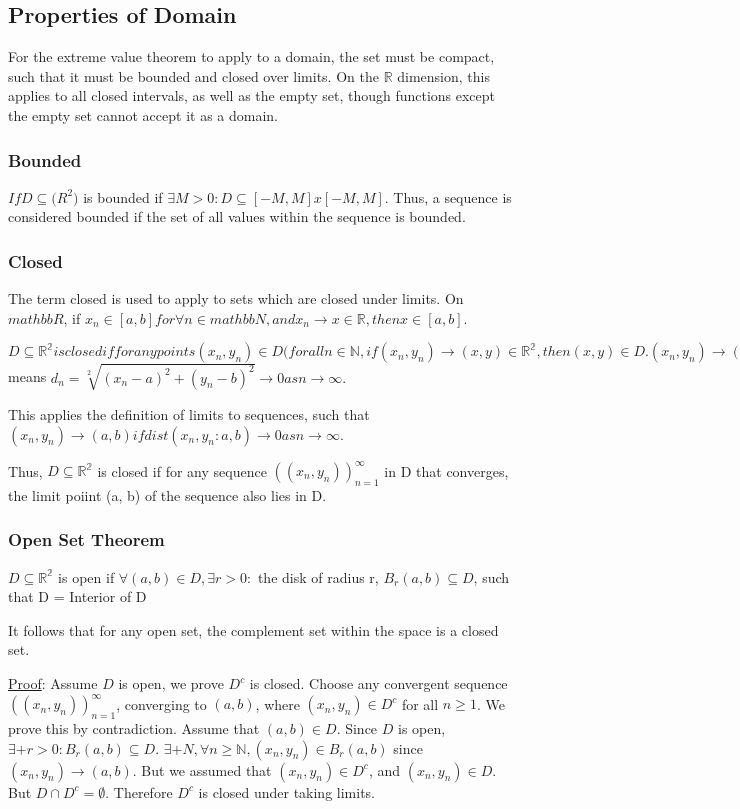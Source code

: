 \documentclass[11 pt, twoside]{article}
\begin{document}
\subsection{Properties of Domain}
For the extreme value theorem to apply to a domain, the set must be compact, such that it must be bounded and closed over limits. On the $\mathbb{R}$ dimension, this applies to all closed intervals, as well as the empty set, though functions except the empty set cannot accept it as a domain.

\subsubsection{Bounded}
$If D \subseteq \mathbb(R^2)$ is bounded if $\exists M > 0: D \subseteq [-M, M] x [-M, M]$. Thus, a sequence is considered bounded if the set of all values within the sequence is bounded.

\subsubsection{Closed}
The term closed is used to apply to sets which are closed under limits. On $mathbb{R}$, if $x_n \in [a, b] for \forall n \in mathbb{N}, and x_n \to x \in \mathbb{R}, then x \in [a, b]$.

$D \subseteq \mathbb{R^2} is closed if for any points (x_n, y_n) \in D (for all n \in \mathbb{N}, if (x_n, y_n) \to (x, y) \in \mathbb{R^2}, then (x, y) \in D. (x_n, y_n) \to (a, b) as n \to \infty$ means $d_n = \sqrt[2]{(x_n - a)^2 + (y_n - b)^2} \to 0 as n \to \infty.$

This applies the definition of limits to sequences, such that $(x_n, y_n) \to (a, b) if dist(x_n, y_n: a, b) \to 0 as n \to \infty$.

Thus, $D \subseteq \mathbb{R^2}$ is closed if for any sequence $((x_n, y_n))^\infty_{n=1}$ in D that converges, the limit poiint (a, b) of the sequence also lies in D.

\subsubsection{Open Set Theorem}
$D \subseteq \mathbb{R^2}$ is open if $\forall (a, b) \in D, \exists r > 0:$ the disk of radius r, $B_r(a, b) \subseteq D$, such that D = Interior of D

It follows that for any open set, the complement set within the space is a closed set.

\underline{Proof}:
Assume $D$ is open, we prove $D^c$ is closed. Choose any convergent sequence
$((x_n, y_n))_{n = 1}^\infty$, converging to $(a, b)$, where $(x_n, y_n) \in
D^c$ for all $n \geq 1$.
We prove this by contradiction. Assume that $(a, b) \in D$. Since $D$ is open,
$\exists+ r > 0:B_r(a, b)\subseteq D$. $\exists+ N, \forall n \geq
\mathbb{N}, (x_n, y_n) \in B_r(a, b)$ since $(x_n, y_n)\to(a,b)$. But we
assumed that $(x_n, y_n) \in D^c$, and $(x_n, y_n) \in D$. But $D \cap D^c =
\emptyset$. Therefore $D^c$ is closed under taking limits.
\end{document}
